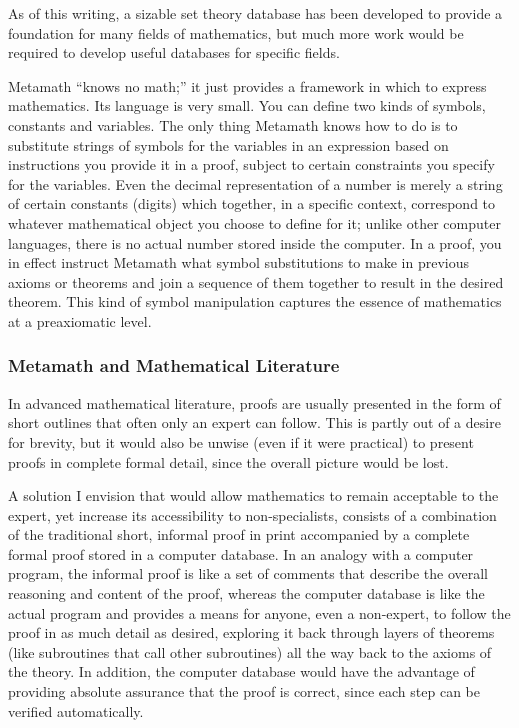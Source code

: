 As of this writing, a sizable set theory database has been developed to
provide a foundation for many fields of mathematics, but much more work would
be required to develop useful databases for specific fields.

Metamath ``knows no math;'' it just provides a framework in
which to express mathematics.  Its language is very small.  You can define two
kinds of symbols, constants and variables.
The only thing Metamath knows how to do is to substitute strings of symbols
for the variables in
an expression based on instructions you provide it in a proof, subject to
certain constraints you specify for the variables.  Even the decimal
representation of a number is merely a string of certain constants (digits)
which together, in a specific context, correspond to whatever mathematical
object you choose to define for it; unlike other computer languages, there is
no actual number stored inside the computer.  In a proof, you in effect
instruct Metamath what symbol substitutions to make in previous axioms or
theorems and join a sequence of them together to result in the desired
theorem.  This kind of symbol manipulation captures the essence of mathematics
at a preaxiomatic level.

\subsubsection{Metamath and Mathematical Literature}

In advanced mathematical literature, proofs are usually presented in the form
of short outlines that often only an expert can follow.  This is partly out of
a desire for brevity, but it would also be unwise (even if it were practical)
to present proofs in complete formal detail, since the overall picture would
be lost.

A solution I envision\label{envision} that would allow mathematics to remain
acceptable to the expert, yet increase its accessibility to non-specialists,
consists of a combination of the traditional short, informal proof in print
accompanied by a complete formal proof stored in a computer database.  In an
analogy with a computer program, the informal proof is like a set of comments
that describe the overall reasoning and content of the proof, whereas the
computer database is like the actual program and provides a means for anyone,
even a non-expert, to follow the proof in as much detail as desired, exploring
it back through layers of theorems (like subroutines that call other
subroutines) all the way back to the axioms of the theory.  In addition, the
computer database would have the advantage of providing absolute assurance
that the proof is correct, since each step can be verified automatically.

